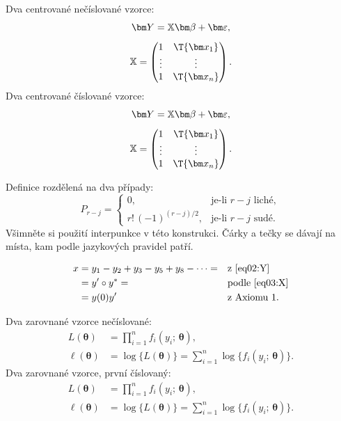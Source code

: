 Dva centrované nečíslované vzorce:
\begin{gather*}
  \bm Y = \mathbb{X}\bm\beta + \bm\varepsilon, \\[1ex]
  \mathbb{X} = \begin{pmatrix} 1 & \T{\bm x_1} \\ \vdots & \vdots \\ 1 &
                \T{\bm x_n}\end{pmatrix}.
\end{gather*}
Dva centrované číslované vzorce:
\begin{gather}
  \bm Y = \mathbb{X}\bm\beta + \bm\varepsilon, \label{eq02:Y}\\[1ex]
  \mathbb{X} = \begin{pmatrix} 1 & \T{\bm x_1} \label{eq03:X} \\ \vdots & \vdots \\ 1 &
                \T{\bm x_n}\end{pmatrix}.
\end{gather}

Definice rozdělená na dva případy:
\[
  P_{r-j}=
  \begin{cases}
    0,                  & \text{je-li $r-j$ liché}, \\
    r!\,(-1)^{(r-j)/2}, & \text{je-li $r-j$ sudé}.
  \end{cases}
\]
Všimněte si použití interpunkce v této konstrukci. Čárky a tečky se
dávají na místa, kam podle jazykových pravidel patří.

\begin{align}
  x & = y_1-y_2+y_3-y_5+y_8-\dots = &  & \text{z \eqref{eq02:Y}} \nonumber     \\
    & = y'\circ y^* =               &  & \text{podle \eqref{eq03:X}} \nonumber \\
    & = y(0) y'                     &  & \text {z Axiomu 1.}
\end{align}


Dva zarovnané vzorce nečíslované:
\begin{align*}
  L(\bm\theta)    & = \prod_{i=1}^n f_i(y_i;\,\bm\theta), \\
  \ell(\bm\theta) & = \log\bigl\{L(\bm\theta)\bigr\} =
  \sum_{i=1}^n \log\bigl\{f_i(y_i;\,\bm\theta)\bigr\}.
\end{align*}
Dva zarovnané vzorce, první číslovaný:
\begin{align}
  L(\bm\theta)    & = \prod_{i=1}^n f_i(y_i;\,\bm\theta), \label{eq01:L} \\
  \ell(\bm\theta) & = \log\bigl\{L(\bm\theta)\bigr\} =
  \sum_{i=1}^n \log\bigl\{f_i(y_i;\,\bm\theta)\bigr\}. \nonumber
\end{align}

